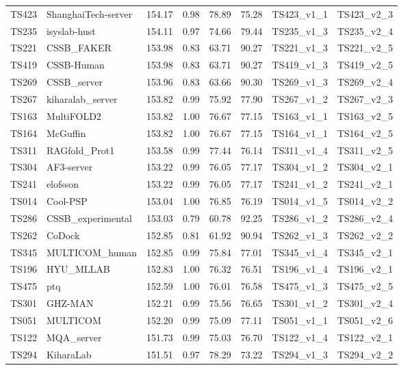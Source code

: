 \begin{longtable}{llllllll}
TS423 & ShanghaiTech-server & 154.17 & 0.98 & 78.89 & 75.28 & TS423\_v1\_1 & TS423\_v2\_3 \\ 
TS235 & isyslab-hust & 154.11 & 0.97 & 74.66 & 79.44 & TS235\_v1\_3 & TS235\_v2\_4 \\ 
TS221 & CSSB\_FAKER & 153.98 & 0.83 & 63.71 & 90.27 & TS221\_v1\_3 & TS221\_v2\_5 \\ 
TS419 & CSSB-Human & 153.98 & 0.83 & 63.71 & 90.27 & TS419\_v1\_3 & TS419\_v2\_5 \\ 
TS269 & CSSB\_server & 153.96 & 0.83 & 63.66 & 90.30 & TS269\_v1\_3 & TS269\_v2\_4 \\ 
TS267 & kiharalab\_server & 153.82 & 0.99 & 75.92 & 77.90 & TS267\_v1\_2 & TS267\_v2\_3 \\ 
TS163 & MultiFOLD2 & 153.82 & 1.00 & 76.67 & 77.15 & TS163\_v1\_1 & TS163\_v2\_5 \\ 
TS164 & McGuffin & 153.82 & 1.00 & 76.67 & 77.15 & TS164\_v1\_1 & TS164\_v2\_5 \\ 
TS311 & RAGfold\_Prot1 & 153.58 & 0.99 & 77.44 & 76.14 & TS311\_v1\_4 & TS311\_v2\_5 \\ 
TS304 & AF3-server & 153.22 & 0.99 & 76.05 & 77.17 & TS304\_v1\_2 & TS304\_v2\_1 \\ 
TS241 & elofsson & 153.22 & 0.99 & 76.05 & 77.17 & TS241\_v1\_2 & TS241\_v2\_1 \\ 
TS014 & Cool-PSP & 153.04 & 1.00 & 76.85 & 76.19 & TS014\_v1\_5 & TS014\_v2\_2 \\ 
TS286 & CSSB\_experimental & 153.03 & 0.79 & 60.78 & 92.25 & TS286\_v1\_2 & TS286\_v2\_4 \\ 
TS262 & CoDock & 152.85 & 0.81 & 61.92 & 90.94 & TS262\_v1\_3 & TS262\_v2\_2 \\ 
TS345 & MULTICOM\_human & 152.85 & 0.99 & 75.84 & 77.01 & TS345\_v1\_4 & TS345\_v2\_1 \\ 
TS196 & HYU\_MLLAB & 152.83 & 1.00 & 76.32 & 76.51 & TS196\_v1\_4 & TS196\_v2\_1 \\ 
TS475 & ptq & 152.59 & 1.00 & 76.01 & 76.58 & TS475\_v1\_3 & TS475\_v2\_5 \\ 
TS301 & GHZ-MAN & 152.21 & 0.99 & 75.56 & 76.65 & TS301\_v1\_2 & TS301\_v2\_4 \\ 
TS051 & MULTICOM & 152.20 & 0.99 & 75.09 & 77.11 & TS051\_v1\_1 & TS051\_v2\_6 \\ 
TS122 & MQA\_server & 151.73 & 0.99 & 75.03 & 76.70 & TS122\_v1\_4 & TS122\_v2\_1 \\ 
TS294 & KiharaLab & 151.51 & 0.97 & 78.29 & 73.22 & TS294\_v1\_3 & TS294\_v2\_2 \\ 

\end{longtable}
